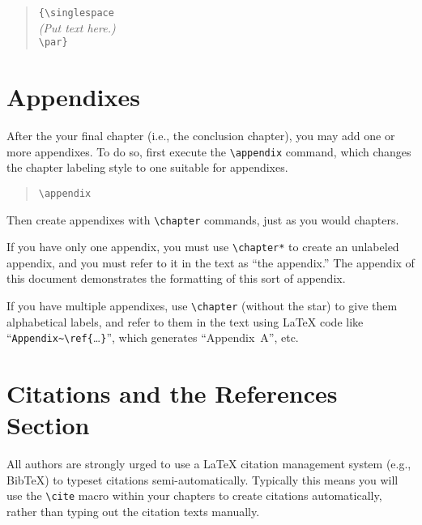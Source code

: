\documentclass[doublespacing]{utdthesis}
\let\cite=\citep
\providecommand{\hyperref}[2][]{#2}
\newenvironment{exampleclasscode}
 {\parindent=1cm\begin{verse}}
 {\end{verse}}
\begin{document}
\begin{exampleclasscode}
\verb|{\singlespace | \\
\textit{(Put text here.)} \\
\verb|\par}|
\end{exampleclasscode}

\section{Appendixes}
\label{s:appendixes}

After the your final chapter (i.e., the conclusion chapter), you may add one
or more appendixes.
To do so, first execute the \verb|\appendix| command, which changes the chapter
labeling style to one suitable for appendixes.
\begin{exampleclasscode}
\verb|\appendix|
\end{exampleclasscode}
Then create appendixes with \verb|\chapter| commands, just as you would
chapters.

If you have only one appendix, you must use \verb|\chapter*| to create an
unlabeled appendix, and you must refer to it in the text as ``the appendix.''
The \hyperref[a:other]{appendix} of this document demonstrates the formatting
of this sort of appendix.

If you have multiple appendixes, use \verb|\chapter| (without the star) to
give them alphabetical labels, and refer to them in the text using \LaTeX{}
code like ``\verb|Appendix~\ref{|\dots\verb|}|'', which generates
``Appendix~A'', etc.

\section{Citations and the References Section}
\label{s:references}

All authors are strongly urged to use a \LaTeX{} citation management system
(e.g., Bib\TeX) to typeset citations semi-automatically.
Typically this means you will use the \verb|\cite| macro within your chapters
to create citations automatically, rather than typing out the citation texts
manually.
\end{document}
